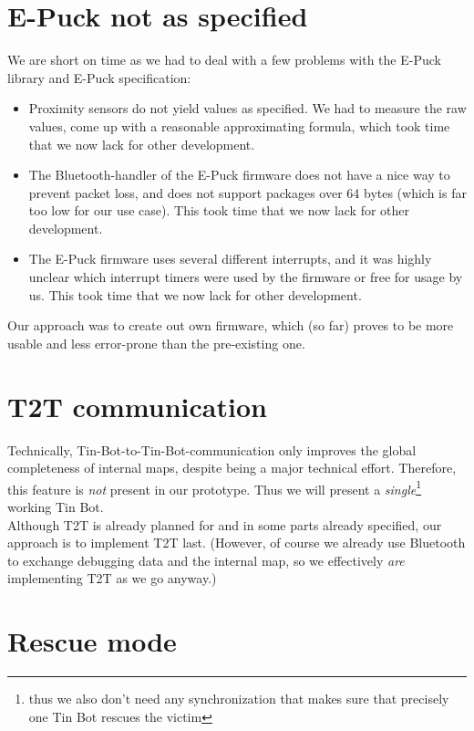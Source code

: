 \documentclass[a4paper,parskip,headheight=38pt]{scrartcl} %
\begin{document}
\section{E-Puck not as specified}

We are short on time as we had to deal with a few problems with the
E-Puck library and E-Puck specification:
\begin{itemize}
    \item Proximity sensors do not yield values as specified.  We had
    to measure the raw values, come up with a reasonable approximating
    formula, which took time that we now lack for other development.
    \item The Bluetooth-handler of the E-Puck firmware does not have a
    nice way to prevent packet loss, and does not support packages over
    64 bytes (which is far too low for our use case).  This took time
    that we now lack for other development.
    \item The E-Puck firmware uses several different interrupts, and it
    was highly unclear which interrupt timers were used by the firmware
    or free for usage by us.  This took time that we now lack for other
    development.
\end{itemize}

Our approach was to create out own firmware, which (so far) proves to
be more usable and less error-prone than the pre-existing one.

\section{T2T communication}

Technically, Tin-Bot-to-Tin-Bot-communication only improves the global
completeness of internal maps, despite being a major technical effort.
Therefore, this feature is \emph{not} present in our prototype.  Thus
we will present a \emph{single}\footnote{thus we also don't need any
synchronization that makes sure that precisely one Tin Bot rescues the
victim} working Tin Bot.
 \\
Although T2T is already planned for and in some parts already
specified, our approach is to implement T2T last.  (However, of course
we already use Bluetooth to exchange debugging data and the internal
map, so we effectively \emph{are} implementing T2T as we go anyway.)

\section{Rescue mode}
\end{document}

